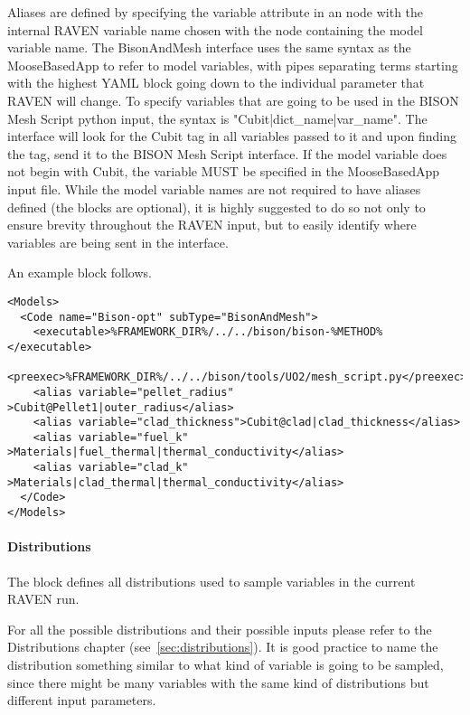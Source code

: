 Aliases are defined by specifying the variable attribute in an  node with
the internal RAVEN variable name chosen with the node containing the model
variable name.  The BisonAndMesh interface uses the same syntax as the
MooseBasedApp to refer to model variables, with pipes separating terms starting
with the highest YAML block going down to the individual parameter that RAVEN
will change.  To specify variables that are going to be used in the BISON Mesh Script
python input, the syntax is "Cubit|dict\_name|var\_name".  The interface
will look for the Cubit tag in all variables passed to it and upon finding the tag,
send it to the BISON Mesh Script interface.  If the model variable does not begin with Cubit,
the variable MUST be specified in the MooseBasedApp input file.  While the model
variable names are not required to have aliases defined (the 
blocks are optional), it is highly suggested to do so not only to ensure brevity
throughout the RAVEN input, but to easily identify where variables are being sent
in the interface.

An example  block follows.

\begin{lstlisting}[style=XML]
<Models>
  <Code name="Bison-opt" subType="BisonAndMesh">
    <executable>%FRAMEWORK_DIR%/../../bison/bison-%METHOD%</executable>
    <preexec>%FRAMEWORK_DIR%/../../bison/tools/UO2/mesh_script.py</preexec>
    <alias variable="pellet_radius" >Cubit@Pellet1|outer_radius</alias>
    <alias variable="clad_thickness">Cubit@clad|clad_thickness</alias>
    <alias variable="fuel_k"        >Materials|fuel_thermal|thermal_conductivity</alias>
    <alias variable="clad_k"        >Materials|clad_thermal|thermal_conductivity</alias>
  </Code>
</Models>
\end{lstlisting}

\paragraph{Distributions}
The  block defines all distributions used to
sample variables in the current RAVEN run.

For all the possible distributions and their possible inputs please
refer to the Distributions chapter (see~\ref{sec:distributions}).
%
It is good practice to name the distribution something similar to what kind of
variable is going to be sampled, since there might be many variables with the
same kind of distributions but different input parameters.


